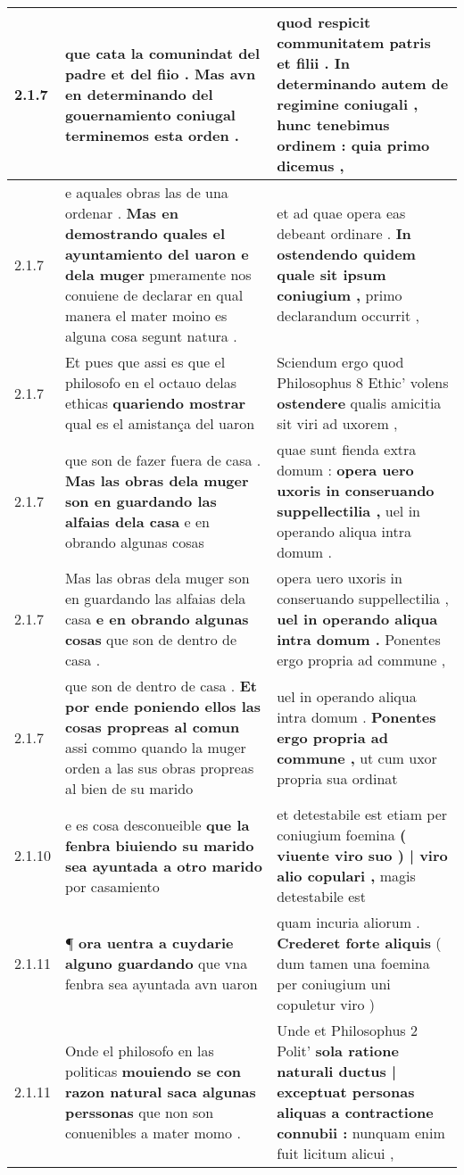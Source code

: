 \begin{tabular}{|p{1cm}|p{6.5cm}|p{6.5cm}|}
2.1.7 & que cata la comunindat del padre et del fiio . \textbf{ Mas avn en determinando del gouernamiento coniugal } terminemos esta orden . & quod respicit communitatem patris et filii . \textbf{ In determinando autem de regimine coniugali , } hunc tenebimus ordinem : quia primo dicemus , \\\hline
2.1.7 & e aquales obras las de una ordenar . \textbf{ Mas en demostrando quales el ayuntamiento del uaron e dela muger } pmeramente nos conuiene de declarar en qual manera el mater moino es alguna cosa segunt natura . & et ad quae opera eas debeant ordinare . \textbf{ In ostendendo quidem quale sit ipsum coniugium , } primo declarandum occurrit , \\\hline
2.1.7 & Et pues que assi es que el philosofo en el octauo delas ethicas \textbf{ quariendo mostrar } qual es el amistança del uaron & Sciendum ergo quod Philosophus 8 Ethic’ volens \textbf{ ostendere } qualis amicitia sit viri ad uxorem , \\\hline
2.1.7 & que son de fazer fuera de casa . \textbf{ Mas las obras dela muger son en guardando las alfaias dela casa } e en obrando algunas cosas & quae sunt fienda extra domum : \textbf{ opera uero uxoris in conseruando suppellectilia , } uel in operando aliqua intra domum . \\\hline
2.1.7 & Mas las obras dela muger son en guardando las alfaias dela casa \textbf{ e en obrando algunas cosas } que son de dentro de casa . & opera uero uxoris in conseruando suppellectilia , \textbf{ uel in operando aliqua intra domum . } Ponentes ergo propria ad commune , \\\hline
2.1.7 & que son de dentro de casa . \textbf{ Et por ende poniendo ellos las cosas propreas al comun } assi commo quando la muger orden a las sus obras propreas al bien de su marido & uel in operando aliqua intra domum . \textbf{ Ponentes ergo propria ad commune , } ut cum uxor propria sua ordinat \\\hline
2.1.10 & e es cosa desconueible \textbf{ que la fenbra biuiendo su marido sea ayuntada a otro marido } por casamiento & et detestabile est etiam per coniugium foemina \textbf{ ( viuente viro suo ) | viro alio copulari , } magis detestabile est \\\hline
2.1.11 & ¶ \textbf{ ora uentra a cuydarie alguno guardando } que vna fenbra sea ayuntada avn uaron & quam incuria aliorum . \textbf{ Crederet forte aliquis } ( dum tamen una foemina per coniugium uni copuletur viro ) \\\hline
2.1.11 & Onde el philosofo en las politicas \textbf{ mouiendo se con razon natural saca algunas perssonas } que non son conuenibles a mater momo . & Unde et Philosophus 2 Polit’ \textbf{ sola ratione naturali ductus | exceptuat personas aliquas a contractione connubii : } nunquam enim fuit licitum alicui , \\\hline

\end{tabular}
